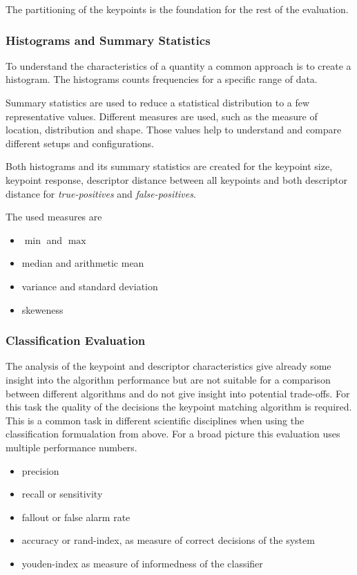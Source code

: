 The partitioning of the keypoints is the foundation for the rest of the evaluation.

\subsubsection{Histograms and Summary Statistics}

To understand the characteristics of a quantity a common approach is to create a histogram.
The histograms counts frequencies for a specific range of data.

Summary statistics are used to reduce a statistical distribution to a few representative values.
Different measures are used, such as the measure of location, distribution and shape.
Those values help to understand and compare different setups and configurations.

Both histograms and its summary statistics are created for the keypoint size, keypoint response, descriptor distance between all keypoints and both descriptor distance for \emph{true-positives} and \emph{false-positives}.

The used measures are
\begin{itemize}
    \item $\min$ and $\max$
    \item median and arithmetic mean
    \item variance and standard deviation
    \item skeweness
\end{itemize}

\subsubsection{Classification Evaluation}

The analysis of the keypoint and descriptor characteristics give already some insight into the algorithm performance but are not suitable for a comparison between different algorithms and do not give insight into potential trade-offs.
For this task the quality of the decisions the keypoint matching algorithm is required.
This is a common task in different scientific disciplines when using the classification formualation from above.
For a broad picture this evaluation uses multiple performance numbers.

\begin{itemize}
    \item precision
    \item recall or sensitivity
    \item fallout or false alarm rate
    \item accuracy or rand-index, as measure of correct decisions of the system
    \item youden-index as measure of informedness of the classifier
\end{itemize}

